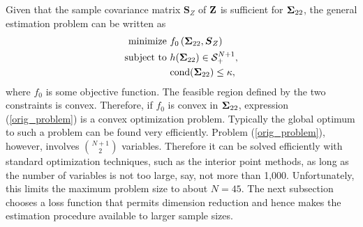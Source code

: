 \documentclass[11pt]{article}
\theoremstyle{definition}
\theoremstyle{definition}
\def\bSigma{{\bf \Sigma}}
\def\Z{{\bf Z}}
\def\cond{\text{cond}}
\begin{document}
Given that the sample covariance matrix $\boldsymbol{S}_Z$ of $\Z$ is sufficient for $\bSigma_{22}$, the general estimation problem can be written as
\begin{align}
\label{orig_problem}
\begin{split}
\text{minimize } &  f_0 \left(\bSigma_{22}, \boldsymbol{S}_Z\right) \\
\text{subject to } & h(\bSigma_{22}) \in \mathcal{S}_{+}^{N+1}, \\
& \cond(\bSigma_{22}) \leq \kappa,
\end{split}
\end{align}
where $f_0$ is some objective function. The feasible region defined by the two constraints is convex. Therefore,
if $f_0$ is convex in $\bSigma_{22}$, expression (\ref{orig_problem}) is a convex optimization problem. 
Typically the global optimum to such a problem can be found very efficiently. Problem (\ref{orig_problem}), however, involves $\binom{N+1}{2}$ variables. Therefore it can be solved efficiently with standard optimization techniques, such as the interior point methods, as long as the number of variables is not too large, say, not more than 1,000. Unfortunately, this limits the maximum problem size  to about $N = 45$. The next subsection chooses a loss function that permits dimension reduction and hence makes the estimation procedure available to larger sample sizes. 
\end{document}
